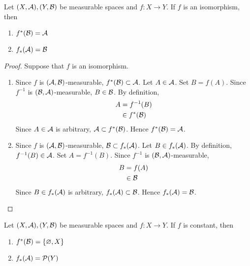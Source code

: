 \documentclass{book}
\begin{document}
	\begin{ex} 
		Let $(X,\mathcal{A}), (Y,\mathcal{B})$ be measurable spaces and $f: X \rightarrow Y$. If $f$ is an isomorphism, then
		\begin{enumerate}
			\item $f^*(\mathcal{B}) = \mathcal{A}$
			\item $f_*(\mathcal{A}) = \mathcal{B}$
		\end{enumerate}
	\end{ex}

	\begin{proof} Suppose that $f$ is an isomorphism.
		\begin{enumerate}
			\item Since $f$ is $(\mathcal{A}, \mathcal{B})$-measurable, $f^*(\mathcal{B}) \subset \mathcal{A}$. Let $A \in \mathcal{A}$. Set $B = f(A)$. Since $f^{-1}$ is $(\mathcal{B}, \mathcal{A})$-measurable, $B \in \mathcal{B}$. By definition, 
			\begin{align*}
				A 
				& = f^{-1}(B) \\
				& \in f^*(\mathcal{B})  
			\end{align*}
			Since $A \in \mathcal{A}$ is arbitrary, $\mathcal{A} \subset f^*(\mathcal{B})$. Hence $f^*(\mathcal{B}) = \mathcal{A}$.
			\item Since $f$ is $(\mathcal{A}, \mathcal{B})$-measurable, $\mathcal{B} \subset f_*(\mathcal{A})$. Let $B \in f_*(\mathcal{A})$. By definition, $f^{-1}(B) \in \mathcal{A}$. Set $A = f^{-1}(B)$.  Since $f^{-1}$ is $(\mathcal{B}, \mathcal{A})$-measurable, 
			\begin{align*}
				B
				& = f(A) \\
				& \in \mathcal{B}
			\end{align*}
			Since $B \in f_*(\mathcal{A})$ is arbitrary, $f_*(\mathcal{A}) \subset \mathcal{B}$. Hence $f_*(\mathcal{A}) = \mathcal{B}$.
		\end{enumerate}
	\end{proof}

	\begin{ex} 
		Let $(X,\mathcal{A}), (Y,\mathcal{B})$ be measurable spaces and $f: X \rightarrow Y$. If $f$ is constant, then 
		\begin{enumerate}
			\item $f^*(\mathcal{B}) = \{\varnothing, X\}$
			\item $f_*(\mathcal{A}) = \mathcal{P}(Y)$
		\end{enumerate}
	\end{ex}
\end{document}
